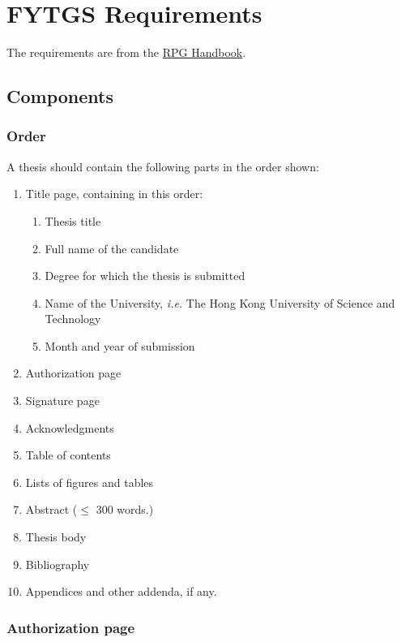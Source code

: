\chapter{FYTGS Requirements}
\label{chap:thesis-preparation}

The requirements are from the \href{https://rpghandbook.hkust.edu.hk/appendices-guidelines-on-thesis-preparation}{RPG Handbook}.

\section{Components}

\subsection{Order}

A thesis should contain the following parts in the order shown:

\begin{enumerate}
  \item Title page, containing in this order:
        \begin{enumerate}
          \item Thesis title
          \item Full name of the candidate
          \item Degree for which the thesis is submitted
          \item Name of the University, \emph{i.e.} The Hong Kong University of Science and Technology
          \item Month and year of submission
        \end{enumerate}
  \item Authorization page
  \item Signature page
  \item Acknowledgments
  \item Table of contents
  \item Lists of figures and tables
  \item Abstract ($\leq$ 300 words.)
  \item Thesis body
  \item Bibliography
  \item Appendices and other addenda, if any.
\end{enumerate}

\subsection{Authorization page}

